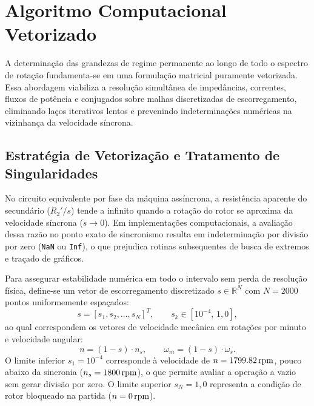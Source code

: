 \section{Algoritmo Computacional Vetorizado}\label{sec:algoritmo_vetorizado}

A determinação das grandezas de regime permanente ao longo de todo o espectro de rotação fundamenta-se em uma formulação matricial puramente vetorizada. Essa abordagem viabiliza a resolução simultânea de impedâncias, correntes, fluxos de potência e conjugados sobre malhas discretizadas de escorregamento, eliminando laços iterativos lentos e prevenindo indeterminações numéricas na vizinhança da velocidade síncrona.

\subsection{Estratégia de Vetorização e Tratamento de Singularidades}\label{subsec:estrategia_vetorizacao}

No circuito equivalente por fase da máquina assíncrona, a resistência aparente do secundário ($R_2'/s$) tende a infinito quando a rotação do rotor se aproxima da velocidade síncrona ($s \to 0$). Em implementações computacionais, a avaliação dessa razão no ponto exato de sincronismo resulta em indeterminação por divisão por zero (\texttt{NaN} ou \texttt{Inf}), o que prejudica rotinas subsequentes de busca de extremos e traçado de gráficos.

Para assegurar estabilidade numérica em todo o intervalo sem perda de resolução física, define-se um vetor de escorregamento discretizado $s \in \mathbb{R}^N$ com $N = 2000$ pontos uniformemente espaçados:
\begin{equation}
s = [s_1, s_2, \dots, s_N]^T, \qquad s_k \in [10^{-4}, \, 1{,}0],
\label{eq:vetor_escorregamento}
\end{equation}
ao qual correspondem os vetores de velocidade mecânica em rotações por minuto e velocidade angular:
\begin{equation}
n = (1 - s) \cdot n_s, \qquad \omega_m = (1 - s) \cdot \omega_s.
\label{eq:vetores_velocidade}
\end{equation}
O limite inferior $s_1 = 10^{-4}$ corresponde à velocidade de $n = \SI{1799,82}{\mathrm{rpm}}$, pouco abaixo da sincronia ($n_s = \SI{1800}{\mathrm{rpm}}$), o que permite avaliar a operação a vazio sem gerar divisão por zero. O limite superior $s_N = 1{,}0$ representa a condição de rotor bloqueado na partida ($n = \SI{0}{\mathrm{rpm}}$).

